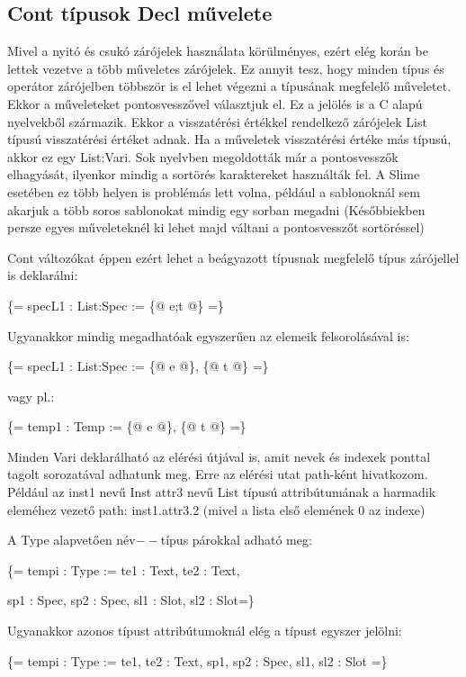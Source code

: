 \subsection{Cont típusok Decl művelete}
\label{sec:SContDecl}
Mivel a nyitó és csukó zárójelek használata körülményes, ezért elég korán be lettek vezetve a több műveletes zárójelek.
Ez annyit tesz, hogy minden típus és operátor zárójelben többször is el lehet végezni a típusának megfelelő műveletet.
Ekkor a műveleteket pontosvesszővel választjuk el.
Ez a jelölés is a C alapú nyelvekből származik.
Ekkor a visszatérési értékkel rendelkező zárójelek List típusú visszatérési értéket adnak.
Ha a műveletek visszatérési értéke más típusú, akkor ez egy List:Vari. 
Sok nyelvben megoldották már a pontosvesszők elhagyását, ilyenkor mindig a sortörés karaktereket használták fel.
A Slime esetében ez több helyen is problémás lett volna, például a sablonoknál sem akarjuk a több soros sablonokat mindig egy sorban megadni
(Későbbiekben persze egyes műveleteknél ki lehet majd váltani a pontosvesszőt sortöréssel)

Cont változókat éppen ezért lehet a beágyazott típusnak megfelelő típus zárójellel is deklarálni:

\{= specL1 : List:Spec := \{@ e;t @\} =\}

Ugyanakkor mindig megadhatóak egyszerűen az elemeik felsorolásával is:

\{= specL1 : List:Spec := \{@ e @\}, \{@ t @\} =\}

vagy pl.:

\{= temp1 : Temp := \{@ e @\}, \{@ t @\} =\}

Minden Vari deklarálható az elérési útjával is, amit nevek és indexek ponttal tagolt sorozatával adhatunk meg.
Erre az elérési utat path-ként hivatkozom.
Például az inst1 nevű Inst attr3 nevű List típusú attribútumának a harmadik eleméhez vezető path: inst1.attr3.2 
(mivel a lista első elemének 0 az indexe)

A Type alapvetően név$--$típus párokkal adható meg:

\{= tempi : Type := te1 : Text, te2 : Text, 

sp1 : Spec, sp2 : Spec, sl1 : Slot, sl2 : Slot=\}

Ugyanakkor azonos típust attribútumoknál elég a típust egyszer jelölni:

\{= tempi : Type := te1, te2 : Text, sp1, sp2 : Spec, sl1, sl2 : Slot =\}

